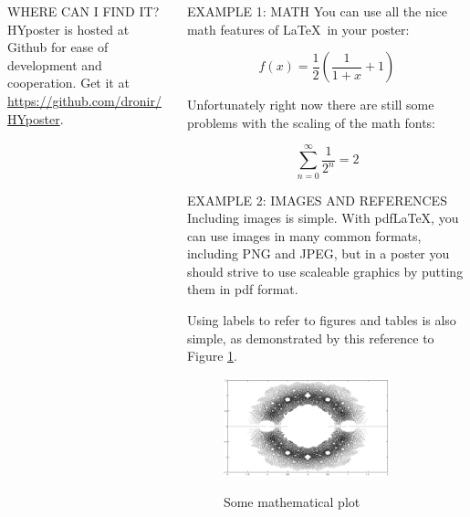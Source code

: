 \documentclass[final]{beamer}
\begin{document}
\begin{frame}[t, fragile]
\begin{columns}[T]
\begin{column}{0.32\linewidth}
\begin{block}{WHERE CAN I FIND IT?}
HYposter is hosted at Github for ease of development and cooperation. Get it at \url{https://github.com/dronir/HYposter}.
\end{block}



\end{column}

\begin{column}{0.32\linewidth}

\begin{block}{EXAMPLE 1: MATH}
	You can use all the nice math features of \LaTeX~in your poster:

	\begin{equation}
		f(x) = \frac{1}{2}\left(\frac{1}{1+x} + 1\right)
	\end{equation}	

	Unfortunately right now there are still some problems with the scaling of the math fonts:

	\begin{equation}
		\sum_{n=0}^\infty \frac{1}{2^n} = 2
	\end{equation}
	


\end{block}
	
	
\begin{block}{EXAMPLE 2: IMAGES AND REFERENCES}
Including images is simple.  With pdf\LaTeX, you can use images in many common formats, including PNG and JPEG, but in a poster you should strive to use scaleable graphics by putting them in pdf format.
	
Using labels to refer to figures and tables is also simple, as demonstrated by this reference to Figure \ref{examplefigure}.

\begin{figure}
\includegraphics[width=0.8\textwidth]{zeros.png}
\label{examplefigure}
\caption{Some mathematical plot}
\end{figure}


\end{block}
\end{column}
\end{columns}
\end{frame}
\end{document}
